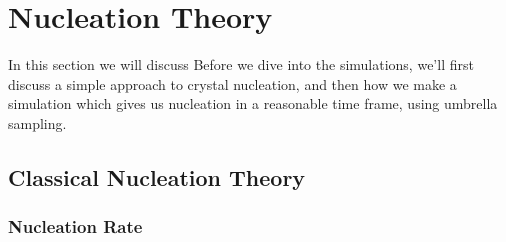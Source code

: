 \documentclass[thesis]{subfiles}
\begin{document}
\section{Nucleation Theory}

In this section we will discuss 
Before we dive into the simulations, we'll first discuss a simple approach to crystal nucleation, and then how we make a simulation which gives us nucleation in a reasonable time frame, using umbrella sampling.

\subsection{Classical Nucleation Theory}\label{subsec:cnt}

\begin{comment} %
The simplest model of nucleation is well known, and goes by the name of classical nucleation theory (CNT). The theory applies when we have a system in a \emph{metastable} state. Heuristically it is as follows. The entire system of interest is in state $A$ with a chemical potential $\mu_A$, but under current conditions (due to e.g. pressure, density) the Gibbs free energy of the system would be lower in state $B$, with a chemical potential $\mu_B < \mu_A$. However, by changing a droplet in the system from state $A$ to state $B$, we create an interface with surface tension $\gamma > 0$ between state $A$ and state $B$. CNT asserts that a droplet is spherical (which makes sense, as this gives the most volume for the least area), so the energy change from a droplet at a radius $r$ will be	
\begin{equation}
	\Delta G(r) = 4\pi r^2 \gamma - \frac{4\pi r^3 \Delta\mu}{3},
\end{equation}
where $\Delta\mu = \mu_A - \mu_B > 0$. Naturally, if making the droplet larger makes this energy cost is greater, i.e. if $\frac{d\Delta G(r)}{dr} > 0$, %
then the system will, in order to minimize the Gibbs free energy, make the droplet smaller. However, because $r^3$ grows faster than $r^2$, at sufficiently high $r$ the bulk energy gain will overtake the surface energy cost. This can be easily calculated by setting the derivative to zero, and we find the critical droplet radius
\begin{equation}
	r^* = \frac{2\gamma}{\Delta\mu}.
\end{equation}
This results in an energy barrier of 
\begin{equation}
	\Delta G (r^*) = \frac{16 \pi \gamma^3}{3 \Delta\mu^2}.
\end{equation}
\end{comment}
\subsubsection{Nucleation Rate}
\end{document}
